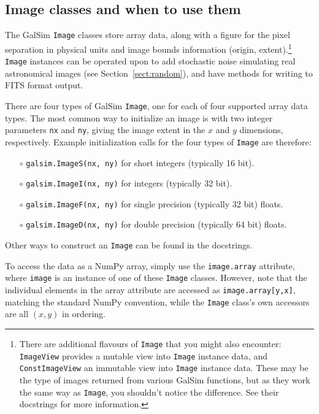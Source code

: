 \documentclass[preprint,11pt]{aastex}
\begin{document}
\subsection{Image classes and when to use them}\label{sect:imageclasses}
The GalSim \texttt{Image} classes store array data, along with a
figure for the pixel separation in physical units and image bounds
information (origin, extent).\footnote{
There are additional flavours
of \texttt{Image} that you might also encounter: \texttt{ImageView}
provides a mutable view into \texttt{Image} instance data, and
\texttt{ConstImageView} an immutable view into \texttt{Image}
instance data.  These may be the type of images returned from
various GalSim functions, but as they work the same way as \texttt{Image},
you shouldn't notice the difference.  See their docstrings for more information.}
\texttt{Image} instances can be operated upon to add stochastic noise
simulating real astronomical images (see Section~\ref{sect:random}),
and have methods for writing to FITS format output.

There are four types of GalSim \texttt{Image}, one for each of four
supported array data types.  The most common way to initialize an
image is with two integer parameters \texttt{nx} and \texttt{ny},
giving the image extent in the $x$ and $y$ dimensions, respectively.
Example initialization calls for the four types of \texttt{Image} are
therefore:
\begin{itemize}
\item[$\circ$] \texttt{galsim.ImageS(nx, ny)} {for short integers (typically 16 bit).}

\item[$\circ$] \texttt{galsim.ImageI(nx, ny)} {for integers (typically 32 bit).}

\item[$\circ$] \texttt{galsim.ImageF(nx, ny)} {for single precision (typically 32 bit)
  floats.}

\item[$\circ$] \texttt{galsim.ImageD(nx, ny)} {for double precision (typically 64 bit)
  floats.}

\end{itemize}
Other ways to construct an \texttt{Image} can be found in the docstrings.

To access the data as a NumPy array, simply use the \texttt{image.array}
attribute, where \texttt{image} is an instance of one of these
\texttt{Image} classes.  However, note that the individual elements in
the array attribute are accessed as \texttt{image.array[y,x]}, matching
the standard NumPy convention, while the \texttt{Image} class's own
accessors are all $(x,y)$ in ordering.
\end{document}
